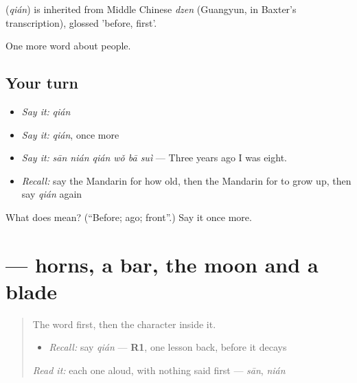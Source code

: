 \begin{cousinweb}
\textbf{} (\emph{qián}) is inherited from Middle Chinese \emph{dzen} (Guangyun, in Baxter's transcription), glossed 'before, first'.
\end{cousinweb}

\begin{grammarlens}[title={What you've built}]
One more word about people.
\end{grammarlens}

\subsection*{Your turn}
\begin{itemize}
\raggedright
  \item \emph{Say it:} \emph{qián}
  \item \emph{Say it:} \emph{qián}, once more
  \item \emph{Say it:} \emph{sān nián qián wǒ bā suì} — Three years ago I was eight.
  \item \emph{Recall:} say the Mandarin for how old, then the Mandarin for to grow up, then say \emph{qián} again
\end{itemize}

\begin{tcolorbox}[breakable,colback=teal!4,colframe=teal!35!black,title={Before you move on}]
What does  mean? (\textquotedblleft{}Before; ago; front\textquotedblright{}.) Say it once more.
\end{tcolorbox}
\section[\texorpdfstring{\zh{前} (qián)}{前 (qián)}]{ — horns, a bar, the moon and a blade}

\label{lesson:ZH-W78-qian-before}



\begin{quote}
The word first, then the character inside it.

\begin{itemize}
\raggedright
  \item \emph{Recall:} say \emph{qián} — \textbf{R1}, one lesson back, before it decays
\end{itemize}

\begin{quote}
 
\end{quote}

\emph{Read it:} each one aloud, with nothing said first — \emph{sān}, \emph{nián}
\end{quote}


